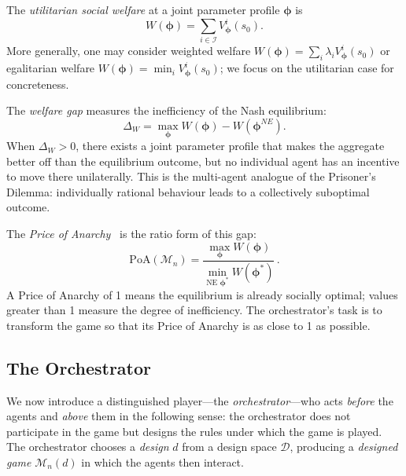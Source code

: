 The \emph{utilitarian social welfare} at a joint parameter profile $\bm{\phi}$ is
\begin{equation}\label{eq:social-welfare}
  W(\bm{\phi}) = \sum_{i\in\mathcal{I}} V^i_{\bm{\phi}}(s_0).
\end{equation}
More generally, one may consider weighted welfare $W(\bm{\phi})=\sum_i \lambda_i V^i_{\bm{\phi}}(s_0)$ or egalitarian welfare $W(\bm{\phi})=\min_i V^i_{\bm{\phi}}(s_0)$; we focus on the utilitarian case for concreteness.

The \emph{welfare gap} measures the inefficiency of the Nash equilibrium:
\begin{equation}\label{eq:welfare-gap}
  \Delta_W = \max_{\bm{\phi}} W(\bm{\phi}) - W(\bm{\phi}^{NE}).
\end{equation}
When $\Delta_W > 0$, there exists a joint parameter profile that makes the aggregate better off than the equilibrium outcome, but no individual agent has an incentive to move there unilaterally. This is the multi-agent analogue of the Prisoner's Dilemma: individually rational behaviour leads to a collectively suboptimal outcome.

The \emph{Price of Anarchy}~\cite{koutsoupias1999} is the ratio form of this gap:
\begin{equation}\label{eq:poa}
  \text{PoA}(\mathcal{M}_n) = \frac{\max_{\bm{\phi}} W(\bm{\phi})}{\min_{\text{NE } \bm{\phi}^*} W(\bm{\phi}^*)}\,.
\end{equation}
A Price of Anarchy of 1 means the equilibrium is already socially optimal; values greater than 1 measure the degree of inefficiency. The orchestrator's task is to transform the game so that its Price of Anarchy is as close to 1 as possible.

\subsection{The Orchestrator}
\label{subsec:orchestrator}

We now introduce a distinguished player---the \emph{orchestrator}---who acts \emph{before} the agents and \emph{above} them in the following sense: the orchestrator does not participate in the game but designs the rules under which the game is played. The orchestrator chooses a \emph{design} $d$ from a design space $\mathcal{D}$, producing a \emph{designed game} $\mathcal{M}_n(d)$ in which the agents then interact.

